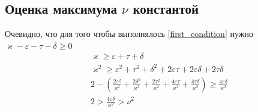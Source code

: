 \documentclass[a4paper]{article}
\begin{document}
\subsection{Оценка максимума $\nu$ константой}
Очевидно, что для того чтобы выполнялось \eqref{first_condition} нужно  $\varkappa - \varepsilon - \tau - \delta \geq 0$
\begin{equation}\label{const_ineq}
 \begin{aligned}
&\varkappa \geq \varepsilon+\tau+\delta \\
&\varkappa^2 \geq \varepsilon^2 + \tau^2 + \delta^2 + 2\varepsilon\tau + 2\varepsilon\delta + 2\tau\delta\\
&2 -(\frac{2\varepsilon^2}{\varkappa^2} + \frac{2\delta^2}{\varkappa^2} + \frac{2\tau^2}{\varkappa^2} +\frac{4\varepsilon\tau}{\varkappa^2} + \frac{4\tau\delta}{\varkappa^2}) \geq \frac{4\varepsilon\delta}{\varkappa^2}\\
&2 > \frac{4\varepsilon\delta}{\varkappa^2} > \nu^2
 \end{aligned}
\end{equation}
\end{document}
